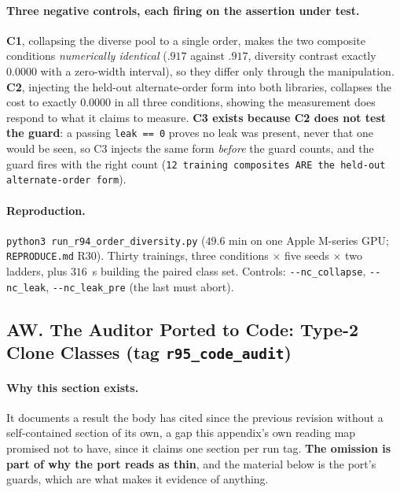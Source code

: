 \paragraph{Three negative controls, each firing on the assertion under test.} \textbf{C1}, collapsing the diverse pool to a single order, makes the two composite conditions \emph{numerically identical} ($.917$ against $.917$, diversity contrast exactly $0.0000$ with a zero-width interval), so they differ only through the manipulation. \textbf{C2}, injecting the held-out alternate-order form into both libraries, collapses the cost to exactly $0.0000$ in all three conditions, showing the measurement does respond to what it claims to measure. \textbf{C3 exists because C2 does not test the guard}: a passing \texttt{leak == 0} proves no leak was present, never that one would be seen, so C3 injects the same form \emph{before} the guard counts, and the guard fires with the right count (\texttt{12 training composites ARE the held-out alternate-order form}).

\paragraph{Reproduction.} \texttt{python3 run\_r94\_order\_diversity.py} ($49.6$ min on one Apple M-series GPU; \texttt{REPRODUCE.md} R30). Thirty trainings, three conditions $\times$ five seeds $\times$ two ladders, plus $316$~s building the paired class set. Controls: \texttt{-{}-nc\_collapse}, \texttt{-{}-nc\_leak}, \texttt{-{}-nc\_leak\_pre} (the last must abort).


\subsection*{AW. The Auditor Ported to Code: Type-2 Clone Classes (tag \texttt{r95\_code\_audit})}

\paragraph{Why this section exists.} It documents a result the body has cited since the previous revision without a self-contained section of its own, a gap this appendix's own reading map promised not to have, since it claims one section per run tag. \textbf{The omission is part of why the port reads as thin}, and the material below is the port's guards, which are what makes it evidence of anything.

